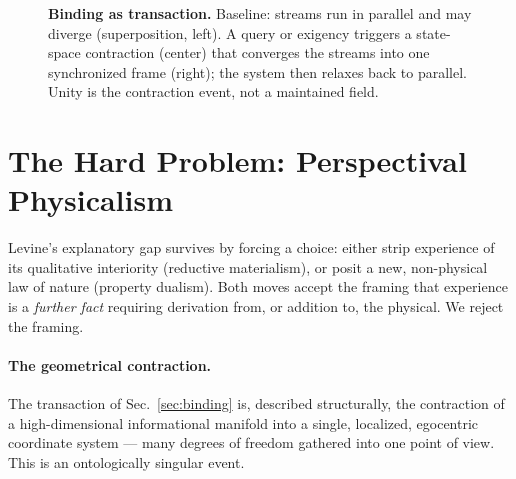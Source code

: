 \documentclass[11pt]{article}
\begin{document}
\begin{figure}[t]
\centering
{}
\caption{\textbf{Binding as transaction.} Baseline: streams run in parallel and may diverge
(superposition, left). A query or exigency triggers a state-space contraction (center) that converges
the streams into one synchronized frame (right); the system then relaxes back to parallel. Unity is the
contraction event, not a maintained field.}
\label{fig:binding}
\end{figure}

\section{The Hard Problem: Perspectival Physicalism}
\label{sec:hard}

Levine's explanatory gap survives by forcing a choice: either strip experience of its qualitative
interiority (reductive materialism), or posit a new, non-physical law of nature (property dualism).
Both moves accept the framing that experience is a \emph{further fact} requiring derivation from, or
addition to, the physical. We reject the framing.

\paragraph{The geometrical contraction.} The transaction of Sec.~\ref{sec:binding} is, described
structurally, the contraction of a high-dimensional informational manifold into a single, localized,
egocentric coordinate system --- many degrees of freedom gathered into one point of view. This is an
ontologically singular event.
\end{document}
